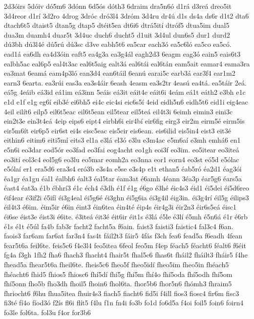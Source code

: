 {2d3óirs
5dóiv
dó5m6
3dónn
6d5ós
dóth3
6draim
dra5n6ó
d1rá
d3reá
dreo5it
3d4reor
d1rí
3d2ro
4drog
3dróc
dró3l4
3dróm
3d4ru
dr4ú
d1s
ds4a
ds6r
d1t2
dta6
dtach6t5
dtaist5
dtan5g
dtap5
dtéit5ea
dt6i6
dtrá5ití
dtróf5
dtua5im
dual5
dua3m
duamh4
duar5t
3d4uc
duch6
ducht5
d1uit
3d4ul
dun6s5
dur1
durd2
dú3bh
dú3l4é
dú5rú
dú3sc
d3ve
eabh5t6
ea5car
each3ó
ea5c6ló
ea5co
ea5có.
ead1á
ea6dh
ea4d3óin
eaft5
ea4g3a
ea3g4ál
eagh2d3
6eagm
eag3ó
eain5
eais6t3
ealbh5ac
eal6p5
eal4t3ac
eal6t5aig
ealt3á
eal6tái
eal6tán
eam5ait
eamar4
eama3ra
ea3mat
6eamá
eam4p3ló
ean3d4
ean6táil
6eanú
earai5c
earb3á
ear3f4
ear1m2
earn3
6earta.
ea3rúi
eas3a
ea3s4áir
6eash
4easm
ea3s2tr
4easú
ea4tá.
ea5táir
2eá.
eá5g
4eáib
eá3id
eá1im
eá3inn
5eáis
eá3it
eáit4e
eáit6i
4eám
eá1t
eáth2
e3bh
e1c
e1d
e1f
e1g
eg6í
eib3é
ei6bh5
ei4c
eic4si
eic6s5í
4eid
eidh5n6
eidh5t6
eid1i
eig4eac
4eil
eilít6
eilp5
eil6t5eac
eil6t5ean
eil5tear
eil5teá
eil4t3i
6eimh
eimin3
eini3c
ein2t3e
ein3t4eá
4eip
eips6
eipt4
eirbh6i
eir4bí
eir6fig
eirg3
eir2m
eirm5é
eirm5is
eir5m6ít
eir6p5
eir6st
ei4s
eisc5eac
eis5cir
eis6ean.
eis6ilid
eis5in4
eist3
eit3é
eithin6
eitim6
eiti5mí
eits3
el1a
e3lá
el3ó
e3lu
e3m4ac
e5m6aí
e3mh
emhá6
en1
e5n6i
eo3dar
eod5ór
eo3fad
eo3fai
eog4acht
eo1gh
eoi3f
eo3im.
eo5itear
eo3iteá
eo3ití
eol3c4
eol5g6
eo3lu
eo5mar
eomh2a
eo3nna
eor1
eorn4
eo3st
eó5d
e5ólac
e5ólaí
er1
era5d6
era3s4
eró3b
e3s4a
e5se
e3s4p
e1t
ethan5
éab5ró
éa2d1
éag3ói
éa1gr
éa1gu
éal1
éalbh6
éalt3
éal5tar
éam3at
é6amh
4éann
3éa3p
éar5g6
éars5a
éast4
éat3a
é1b
ébhrí3
é1c
éch4
é3dh
é1f
é1g
é6go
é3hé
éic4s3
éid1
éi5dei
éi5d6reo
éif4ear
é3if2i
é5ifí
éi3g4eal
éi5g6é
éi3ghn
éi5g6ia
éi3g4il
éig3in.
éi3g4rí
éil5g
éilips3
éil4t3
é6im.
éim5ir
é6in
éint3
éin6tea
éin4té
éip4s
éir4g3i
éir2n3
éir6s5eá
éisc1
éi6se
éist3e
éist3i
é6ite.
é3iteá
éit3é
éit6ir
éit1s
é3lá
é5le
é3lí
é5mh
é5n6á
é1r
é6rb
é1s
é1t
é5úl
fa4b
fab3r
facht2
facht5a
f6ain.
faist3
faisti3
faistic4
fal3c4
f6an.
faois3
far6am
far6at
far3n4
fas4t
fáil2t3
fáir5
4fás
f3ch
fea6
fead5a
f6eadh
4fean
fear5t6a
feil6te.
feis5c6
f4e3l4
feo5itea
6feol
feo5m
f4ep
féach5
féacht6
féalt6
f6éit
fg4a
f3gh
1fh2
fha6
fhach3
fhacht4
fhair5t
fhal5c6
fhas6t
fháil2
fháilt3
fháir5
f4he
fhead5a
fhear5t6a
fheil6te.
fheis5c6
fheo5f
fheo5idí
fheo5im
fheo5in
fhéach5
fhéacht6
fhid5
fhios5
fhiosc6
fhí5dí
fhí5g
fhí5m
fhí4o
fhí5oda
fhí5odh
fhí5om
fhí5onn
fho5b
fho3dh
fhoil5
fhoin6
fhol6ta.
fhor5b6
fhor5n6
fhómh3
fhraim5
fhriocht6
f6hu
fhua5itea
fhuir4s3
fiach5
fiacht6
fid5i
f4ill
fios3
fiosc4
fir6m
fisc3
fi3té
fí4o
fíod3ó
f2ís
fl6i
flít5
f4lu
f1n
fn4i
fo3b
fo1d
fo6d5a
f4oi
foil5
foin6
foirn4
fo3le
fol6ta.
fol3u
f4or
for3b6
}
